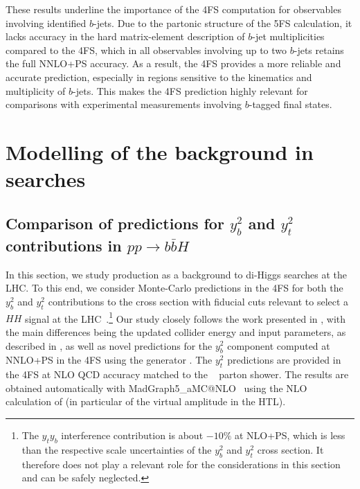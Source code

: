 \documentclass[11pt,a4paper]{article}
\begin{document}
These results underline the importance of the 4FS computation for observables involving identified $b$-jets. Due to the partonic structure of the 5FS calculation, it lacks accuracy in the hard matrix-element description of $b$-jet multiplicities compared to the 4FS, which in all observables involving up to two $b$-jets retains the full NNLO+PS accuracy. 
As a result, the 4FS provides a more reliable and accurate prediction, especially in regions sensitive to the kinematics and multiplicity of $b$-jets. This makes the 4FS prediction highly relevant for comparisons with experimental measurements involving $b$-tagged final states.


\section{Modelling of the  background in  searches}\label{sec:HH}

\subsection{Comparison of predictions for $y_b^2$ and $y_t^2$ contributions in $pp\rightarrow b\bar b H$}
In this section, we study \bbH{} production as a background to di-Higgs searches at the LHC. To this end, we 
consider Monte-Carlo predictions in the 4FS for both the $y_b^2$ and  $y_t^2$ contributions to the \bbH{} cross section
with fiducial cuts relevant to select a $HH$ signal at the LHC~\cite{HDBS-2021-18,CMS-HIG-22-001}.\footnote{The $y_t y_b$ interference contribution is 
about $-10\%$ at NLO+PS, which is less than the respective scale uncertainties of the $y_b^2$ and  $y_t^2$ cross section. It therefore does not play a relevant
role for the considerations in this section and can be safely neglected.}
Our study closely follows the work presented in , with the main differences being the updated 
collider energy and input parameters, as described in , as well as novel predictions for the $y_b^2$ component
computed at NNLO+PS in the 4FS using the \minnlo{} generator \cite{Biello:2024pgo}. The $y_t^2$ predictions 
are provided in the 4FS at NLO QCD accuracy matched to the ~\cite{Bierlich:2022pfr} parton shower. 
The results are obtained automatically with {\sc MadGraph5\_aMC@NLO}~\cite{Alwall:2014hca,Frederix:2018nkq} using the NLO 
calculation of  (in particular of the virtual amplitude in the HTL).
\end{document}
